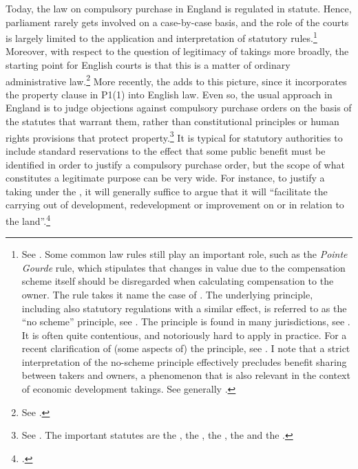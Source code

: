 Today, the law on compulsory purchase in England is regulated in statute. Hence, parliament rarely gets involved on a case-by-case basis, and the role of the courts is largely limited to the application and interpretation of statutory rules.\footnote{See \cite[116-121]{waring09}. Some common law rules still play an important role, such as the {\it Pointe Gourde} rule, which stipulates that changes in value due to the compensation scheme itself should be disregarded when calculating compensation to the owner. The rule takes it name the case of \cite{gourde47}. The underlying principle, including also statutory regulations with a similar effect, is referred to as the ``no scheme'' principle, see \cite{lawcom01}. The principle is found in many jurisdictions, see \cite{sluysmans14}. It is often quite contentious, and notoriously hard to apply in practice. For a recent clarification of (some aspects of) the principle, see \cite{waters04}. I note that a strict interpretation of the no-scheme principle effectively precludes benefit sharing between takers and owners, a phenomenon that is also relevant in the context of economic development takings. See generally \cite{dyrkolbotn15}.} Moreover, with respect to the question of legitimacy of takings more broadly, the starting point for English courts is that this is a matter of ordinary administrative law.\footnote{See \cite{taggart98}.} More recently, the \cite{hra98} adds to this picture, since it incorporates the property clause in P1(1) into English law. Even so, the usual approach in England is to judge objections against compulsory purchase orders on the basis of the statutes that warrant them, rather than constitutional principles or human rights provisions that protect property.\footnote{See \cite[121-132]{waring09}. The important statutes are the \cite{ala81}, the \cite{lca61}, the \cite{cpa65}, the \cite{tcpa90} and the \cite{pcpa04}.} It is typical for statutory authorities to include standard reservations to the effect that some public benefit must be identified in order to justify a compulsory purchase order, but the scope of what constitutes a legitimate purpose can be very wide. For instance, to justify a taking under the \cite{tcpa90}, it will generally suffice to argue that it will ``facilitate the carrying out of development, redevelopment or improvement on or in relation to the land''.\footcite[226]{tcpa90}

